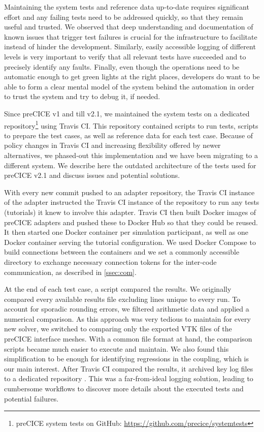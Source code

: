 Maintaining the system tests and reference data up-to-date requires significant effort and any failing tests need to be addressed quickly, so that they remain useful and trusted. We observed that deep understanding and documentation of known issues that trigger test failures is crucial for the infrastructure to facilitate instead of hinder the development. Similarly, easily accessible logging of different levels is very important to verify that all relevant tests have succeeded and to precisely identify any faults. Finally, even though the operations need to be automatic enough to get green lights at the right places, developers do want to be able to form a clear mental model of the system behind the automation in order to trust the system and try to debug it, if needed.

Since preCICE v1 and till v2.1, we maintained the system tests on a dedicated repository\footnote{preCICE system tests on GitHub: \url{https://github.com/precice/systemtests}} using Travis CI. This repository contained scripts to run tests, scripts to prepare the test cases, as well as reference data for each test case. Because of policy changes in Travis CI and increasing flexibility offered by newer alternatives, we phased-out this implementation and we have been migrating to a different system. We describe here the outdated architecture of the tests used for preCICE v2.1 and discuss issues and potential solutions.

With every new commit pushed to an adapter repository, the Travis CI instance of the adapter instructed the Travis CI instance of the  repository to run any tests (tutorials) it knew to involve this adapter. Travis CI then built Docker images of preCICE adapters and pushed these to Docker Hub so that they could be reused. It then started one Docker container per simulation participant, as well as one Docker container serving the tutorial configuration. We used Docker Compose to build connections between the containers and we set a commonly accessible directory to exchange necessary connection tokens for the inter-code communication, as described in \autoref{ssec:com}.


At the end of each test case, a script compared the results. We originally compared every available results file excluding lines unique to every run. To account for sporadic rounding errors, we filtered arithmetic data and applied a numerical comparison. As this approach was very tedious to maintain for every new solver, we switched to comparing only the exported VTK files of the preCICE interface meshes. With a common file format at hand, the comparison scripts became much easier to execute and maintain. We also found this simplification to be enough for identifying regressions in the coupling, which is our main interest.
After Travis CI compared the results, it archived key log files to a dedicated repository .
This was a far-from-ideal logging solution, leading to cumbersome workflows to discover more details about the executed tests and potential failures.

